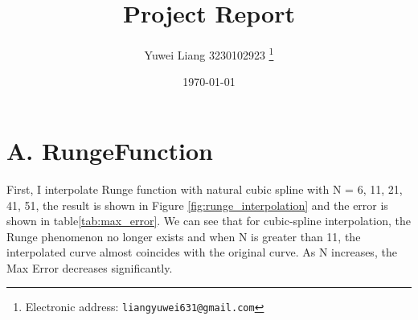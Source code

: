 \documentclass[a4paper]{article}
\begin{document}
\title{Project Report}

\author{Yuwei Liang 3230102923
  \thanks{Electronic address: \texttt{liangyuwei631@gmail.com}}}

\date{\today}

\maketitle

\begin{abstract}
\end{abstract}


\section*{A. RungeFunction}
First, I interpolate Runge function with natural cubic spline with N = 6, 11, 21, 41, 51, the result is shown in Figure \ref{fig:runge_interpolation} and the error is shown in table\ref{tab:max_error}.
We can see that for cubic-spline interpolation, the Runge phenomenon no longer exists and when N is greater than 11, the interpolated curve almost coincides with the original curve. As N increases, the Max Error decreases significantly.
\end{document}
